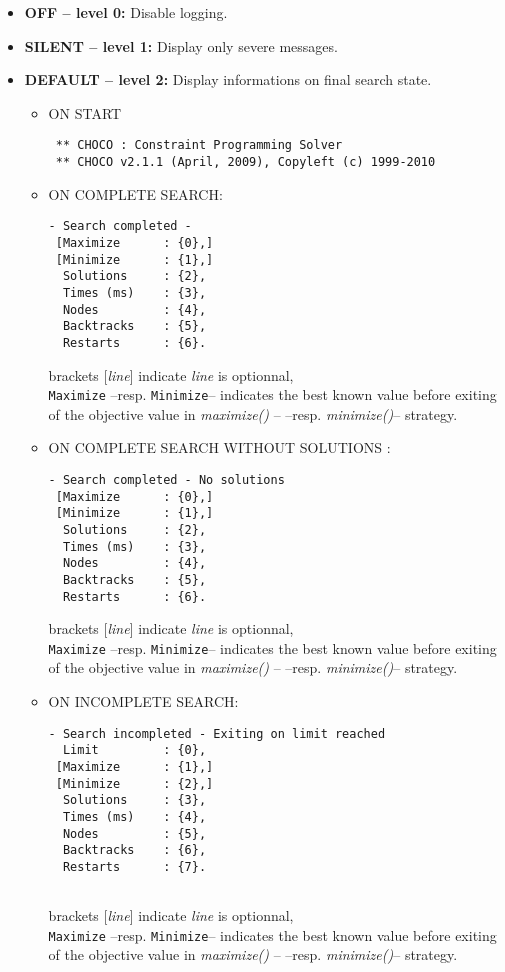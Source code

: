 \begin{itemize}
	\item \textbf{OFF -- level 0:} Disable logging.
	\item \textbf{SILENT -- level 1:} Display only severe messages.
	\item \textbf{DEFAULT -- level 2:} Display informations on final search state.
		\begin{itemize}
			\item ON START
\begin{lstlisting}
 ** CHOCO : Constraint Programming Solver
 ** CHOCO v2.1.1 (April, 2009), Copyleft (c) 1999-2010
 \end{lstlisting}
			\item ON COMPLETE SEARCH:
				\begin{lstlisting}
- Search completed -
 [Maximize		: {0},]
 [Minimize		: {1},]
  Solutions		: {2},
  Times (ms)	: {3},
  Nodes			: {4},
  Backtracks	: {5},
  Restarts		: {6}.
  \end{lstlisting}
	brackets [\textit{line}] indicate \textit{line} is optionnal,\\
 	\texttt{Maximize} --resp. \texttt{Minimize}-- indicates the best known value before exiting of the objective value in \textit{maximize()} -- --resp. \textit{minimize()}-- strategy.

			\item ON COMPLETE SEARCH WITHOUT SOLUTIONS :
				\begin{lstlisting}
- Search completed - No solutions
 [Maximize		: {0},]
 [Minimize		: {1},]
  Solutions		: {2},
  Times (ms)	: {3},
  Nodes			: {4},
  Backtracks	: {5},
  Restarts		: {6}.
\end{lstlisting}
	brackets [\textit{line}] indicate \textit{line} is optionnal,\\
 	\texttt{Maximize} --resp. \texttt{Minimize}-- indicates the best known value before exiting of the objective value in \textit{maximize()} -- --resp. \textit{minimize()}-- strategy.

			\item ON INCOMPLETE SEARCH:
				\begin{lstlisting}
- Search incompleted - Exiting on limit reached
  Limit			: {0},
 [Maximize		: {1},]
 [Minimize		: {2},]
  Solutions		: {3},
  Times (ms)	: {4},
  Nodes			: {5},
  Backtracks	: {6},
  Restarts		: {7}.
  
  \end{lstlisting}
	brackets [\textit{line}] indicate \textit{line} is optionnal,\\
 	\texttt{Maximize} --resp. \texttt{Minimize}-- indicates the best known value before exiting of the objective value in \textit{maximize()} -- --resp. \textit{minimize()}-- strategy.
		\end{itemize}			


\end{itemize}
